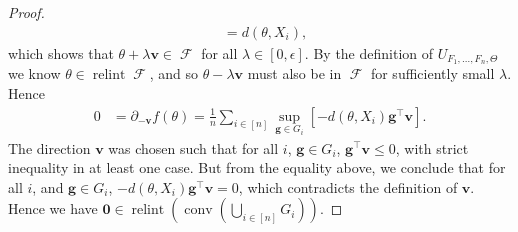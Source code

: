\documentclass[10pt]{article}
\theoremstyle{definition}
\theoremstyle{remark}
\newcommand{\T}{\intercal}
\newcommand{\CType}{F_1,\dots,F_n}
\DeclareMathOperator{\conv}{conv}
\DeclareMathOperator{\relint}{relint}
\DeclareMathOperator{\FMset}{\mathcal{F}}
\renewcommand{\vec}[1]{\mathbf{#1}}
\begin{document}
\begin{proof}
\begin{align*}
			&= d(\theta,X_i),
		\end{align*}
		which shows that $\theta + \lambda \vec v \in \FMset$ for all $\lambda \in [0,\epsilon]$. 
		By the definition of $U_{\CType,\Theta}$ we know $\theta \in \relint \FMset$, and so $\theta - \lambda \vec v$ must also be in $\FMset$ for sufficiently small $\lambda$. Hence
		\begin{align*}
			0 &= \partial_{-\vec v} f(\theta) =\textstyle \frac{1}{n} \sum_{i \in [n]} \sup_{\vec g \in G_i} [-d(\theta, X_i)\vec g^{\T}\vec v].
		\end{align*}
		The direction $\vec v$ was chosen such that for all $i$, $\vec g \in G_i$, $\vec g^{\T}\vec v\leq 0$, with strict inequality in at least one case. But from the equality above, we conclude that for all $i$, and $\vec g \in G_i$, $-d(\theta, X_i)\vec g^{\T}\vec v = 0$, which contradicts the definition of $\vec v$. Hence we have $\vec 0 \in \relint \left( \conv \left(\textstyle \bigcup_{i \in [n]} G_i \right) \right)$.
		

\end{proof}
\end{document}
